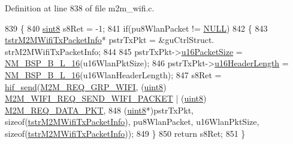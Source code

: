 Definition at line 838 of file m2m\+\_\+wifi.\+c.


\begin{DoxyCode}
839 \{
840     \hyperlink{group__DataT_gae35f10ffd0ac8dd2bc3e794da9bdfbc7}{sint8}  s8Ret = -1;
841     \textcolor{keywordflow}{if}(pu8WlanPacket != \hyperlink{group__BSPDefine_ga070d2ce7b6bb7e5c05602aa8c308d0c4}{NULL})
842     \{
843         \hyperlink{structtstrM2MWifiTxPacketInfo}{tstrM2MWifiTxPacketInfo}*     pstrTxPkt = &guCtrlStruct.
      strM2MWifiTxPacketInfo;
844 
845         pstrTxPkt->\hyperlink{structtstrM2MWifiTxPacketInfo_a4cd9dd241fe12bc078100cebf1298e20}{u16PacketSize}       = \hyperlink{nm__bsp_8h_a22348273616354c0ac8a3de5ce4fb963}{NM\_BSP\_B\_L\_16}(u16WlanPktSize);
846         pstrTxPkt->\hyperlink{structtstrM2MWifiTxPacketInfo_a6890b3d90c9578aa3ecaa545fabe5860}{u16HeaderLength}   = \hyperlink{nm__bsp_8h_a22348273616354c0ac8a3de5ce4fb963}{NM\_BSP\_B\_L\_16}(u16WlanHeaderLength);
847         s8Ret = \hyperlink{m2m__hif_8c_a13ba8ad11b2ac39516ca787386d16ce0}{hif\_send}(\hyperlink{nm__common_8h_a9ab02eb1aea02a75c3f5aade4eef1276aeb9a7d57324ba4b8a6c2a5f46dd499c2}{M2M\_REQ\_GRP\_WIFI}, (\hyperlink{group__DataT_ga4df709a77647e870bbf1d955b8edc9a6}{uint8})
      \hyperlink{group__WlanEnums_gga064de09dec1d5e88ed8d075fa40f57dea2b7c8096c454e60f44dfd665e62be3c5}{M2M\_WIFI\_REQ\_SEND\_WIFI\_PACKET} | (\hyperlink{group__DataT_ga4df709a77647e870bbf1d955b8edc9a6}{uint8})
      \hyperlink{nm__common_8h_a8f14623395b4e817613140afdf87fe6fa4ba55ee3c10f0b8175bba12f4b39a499}{M2M\_REQ\_DATA\_PKT},
848         (\hyperlink{group__DataT_ga4df709a77647e870bbf1d955b8edc9a6}{uint8}*)pstrTxPkt, \textcolor{keyword}{sizeof}(\hyperlink{structtstrM2MWifiTxPacketInfo}{tstrM2MWifiTxPacketInfo}), pu8WlanPacket, 
      u16WlanPktSize, \textcolor{keyword}{sizeof}(\hyperlink{structtstrM2MWifiTxPacketInfo}{tstrM2MWifiTxPacketInfo}));
849     \}
850     \textcolor{keywordflow}{return} s8Ret;
851 \}
\end{DoxyCode}
